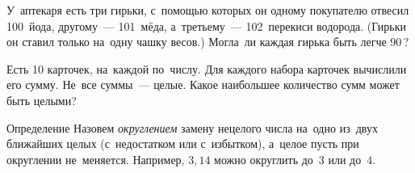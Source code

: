 



\begin{exercises}

У~аптекаря есть три гирьки, с~помощью которых он
одному покупателю отвесил 100\, йода,
другому~--- 101\, мёда,
а~третьему~--- 102\, перекиси водорода.
(Гирьки он ставил только на~одну чашку весов.)
Могла~ли каждая гирька быть легче 90\,?

\item
Есть 10 карточек, на~каждой по~числу.
Для каждого набора карточек вычислили его сумму.
Не~все суммы~--- целые.
Какое наибольшее количество сумм может быть целыми?

\end{exercises}

\begin{claim}{Определение}
Назовем \emph{округлением} замену нецелого числа на~одно из~двух ближайших
целых (с~недостатком или с~избытком), а~целое пусть при округлении не~меняется.
Например, $3{,}14$ можно округлить до~$3$ или до~$4$.
\end{claim}

